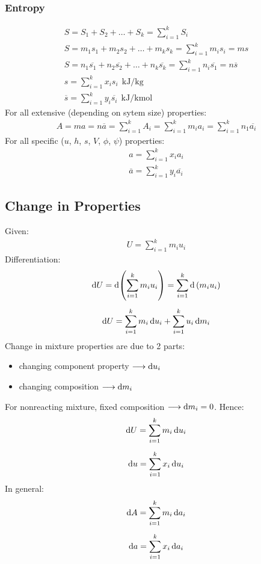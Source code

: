 \documentclass[class=report, crop=false, 12pt,a4paper]{standalone}
\numberwithin{equation}{section}
\begin{document}
\subsubsection{Entropy}
\begin{gather}
  S = S_1 + S_2 + \dots + S_k = \sum_{i=1}^{k}S_i \\[5pt]
  S = m_1s_1 + m_2s_2 + \dots + m_ks_k = \sum_{i=1}^{k}m_is_i = ms \\[5pt]
  S = n_1\overline{s_1} + n_2\overline{s_2} + \dots + n_k\overline{s_k} = \sum_{i=1}^{k} n_i\overline{s_1} = n\overline{s} \\[5pt]
  s = \sum_{i=1}^{k} x_i s_i \ \ \si{\kilo\joule\per\kilogram} \\[5pt]
  \overline{s} = \sum_{i=1}^{k} y_i \overline{s_i} \ \ \si{\kilo\joule\per\kilo\mole}
\end{gather}
For all extensive (depending on sytem size) properties:
\begin{gather}
  A = ma = n\overline{a} = \sum_{i=1}^{k}A_i = \sum_{i=1}^{k}m_i a_i = \sum_{i=1}^{k}n_1\overline{a_i}
\end{gather}
For all specific ($u$, $h$, $s$, $V$, $\phi$, $\psi$) properties: 
\begin{gather}
  a = \sum_{i=1}^{k}x_i a_i \\[5pt]
  \overline{a} = \sum_{i=1}^{k}y_i \overline{a_i}
\end{gather}
\subsection{Change in Properties}
Given:
\begin{gather}
  U = \sum_{i=1}^{k}m_i u_i
\end{gather}
Differentiation:
\begin{gather}
  \dif U = \dif\left(\sum_{i=1}^{k}m_i u_i\right) = \sum_{i=1}^{k}\dif\ (m_i u_i) \\[5pt]
  \dif U = \sum_{i=1}^{k}m_i\dif u_i + \sum_{i=1}^{k}u_i\dif m_i
\end{gather}
Change in mixture properties are due to 2 parts:
\begin{itemize}[noitemsep]
  \item changing component property $\longrightarrow \dif u_i$
  \item changing composition $\longrightarrow \dif m_i$
\end{itemize}
For nonreacting mixture, fixed composition $\longrightarrow \dif m_i = 0$. Hence:
\begin{gather}
  \dif U = \sum_{i=1}^{k}m_i\dif u_i \\[5pt]
  \dif u = \sum_{i=1}^{k}x_i\dif u_i
\end{gather}
In general:
\begin{gather}
  \dif A = \sum_{i=1}^{k}m_i \dif a_i \\[5pt]
  \dif a = \sum_{i=1}^{k}x_i \dif a_i
\end{gather}
\end{document}
